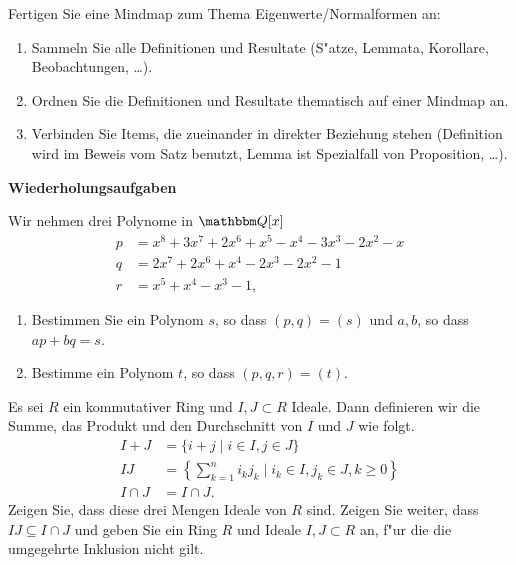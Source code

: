 \documentclass[a4,11pt]{article}
\begin{document}
\begin{aufgabe}[4 Quizbonuspunkte]
  Fertigen Sie eine Mindmap zum Thema
  Eigenwerte/Normalformen an:
  \begin{enumerate}
  \item Sammeln Sie alle Definitionen und Resultate (S"atze, Lemmata,
    Korollare, Beobachtungen, \ldots).
  \item Ordnen Sie die Definitionen und Resultate thematisch auf einer
    Mindmap an.
  \item Verbinden Sie Items, die zueinander in direkter Beziehung
    stehen (Definition wird im Beweis vom Satz benutzt, Lemma ist
    Spezialfall von Proposition, \ldots).
  \end{enumerate}
\end{aufgabe}



\newpage
\bigskip
{\Large \bfseries Wiederholungsaufgaben}
\bigskip

\begin{aufgabe}
Wir nehmen drei Polynome in $\Q[x]$
\begin{align*}
p &= x^8 + 3x^7 + 2x^6 + x^5 - x^4 - 3x^3 - 2x^2 - x\\
q &= 2x^7 + 2x^6 + x^4 - 2x^3 - 2x^2 - 1\\
r &= x^5 + x^4 - x^3 - 1,
\end{align*}
\begin{enumerate}
\item
  Bestimmen Sie ein Polynom $s$, so dass $(p,q) = (s)$
  und $a,b$, so dass $ap+bq=s$.
\item
  Bestimme ein Polynom $t$, so dass $(p,q,r) = (t)$.
 \end{enumerate}
\end{aufgabe}

\begin{aufgabe}

Es sei $R$ ein kommutativer Ring und $I, J \subset R$ Ideale. Dann
definieren wir die Summe, das Produkt und den Durchschnitt von $I$ und
$J$ wie folgt.
\begin{align*}
I + J &= \{ i + j \mid i \in I, j \in J \}\\
IJ &= \left\{ \sum_{k = 1}^n i_k j_k \mid i_k \in I, j_k \in J, k \geq 0 \right\}\\
I \cap J &= I \cap J.
\end{align*}
Zeigen Sie, dass diese drei Mengen Ideale von $R$ sind. Zeigen Sie
weiter, dass $IJ \subseteq I \cap J$ und geben Sie ein Ring $R$ und
Ideale $I, J \subset R$ an, f"ur die die umgegehrte Inklusion nicht gilt.  
\end{aufgabe}
\end{document}

